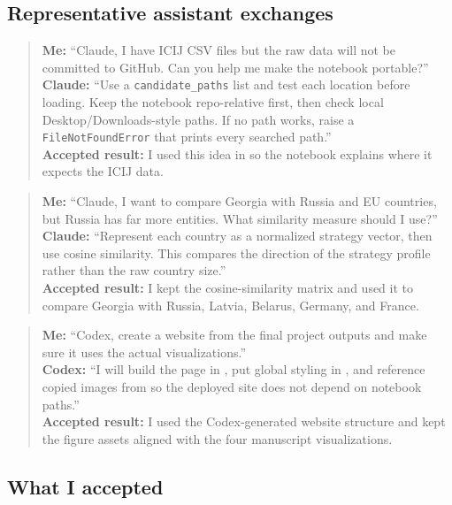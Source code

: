 \documentclass[9pt,twoside]{pnas-new}
\begin{document}
\subsection*{Representative assistant exchanges}

\begin{quote}
\textbf{Me:} ``Claude, I have ICIJ CSV files but the raw data will not be committed to GitHub. Can you help me make the notebook portable?''\\
\textbf{Claude:} ``Use a \texttt{candidate\_paths} list and test each location before loading. Keep the notebook repo-relative first, then check local Desktop/Downloads-style paths. If no path works, raise a \texttt{FileNotFoundError} that prints every searched path.''\\
\textbf{Accepted result:} I used this idea in  so the notebook explains where it expects the ICIJ data.
\end{quote}

\begin{quote}
\textbf{Me:} ``Claude, I want to compare Georgia with Russia and EU countries, but Russia has far more entities. What similarity measure should I use?''\\
\textbf{Claude:} ``Represent each country as a normalized strategy vector, then use cosine similarity. This compares the direction of the strategy profile rather than the raw country size.''\\
\textbf{Accepted result:} I kept the cosine-similarity matrix and used it to compare Georgia with Russia, Latvia, Belarus, Germany, and France.
\end{quote}

\begin{quote}
\textbf{Me:} ``Codex, create a website from the final project outputs and make sure it uses the actual visualizations.''\\
\textbf{Codex:} ``I will build the page in , put global styling in , and reference copied images from  so the deployed site does not depend on notebook paths.''\\
\textbf{Accepted result:} I used the Codex-generated website structure and kept the figure assets aligned with the four manuscript visualizations.
\end{quote}

\subsection*{What I accepted}
\end{document}
